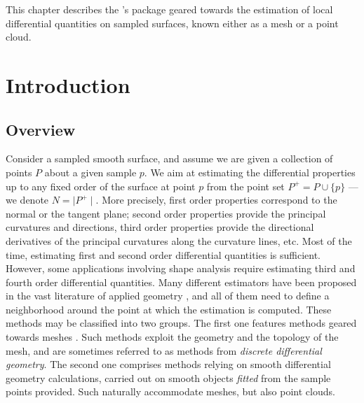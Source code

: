 


This chapter describes the \cgal's package geared towards the
estimation of local differential quantities on sampled surfaces, known
either as a mesh or a point cloud.
 
\section{Introduction}
\label{sec:intro}

\subsection{Overview}

Consider a sampled smooth surface, and assume we are given a
collection of points $P$ about a given sample $p$. We aim at
estimating the differential properties up to any fixed order of the
surface at point $p$ from the point set $P^+ = P\cup \{ p\}$ ---we
denote $N=\mid P^+\mid$. More precisely, first order properties
correspond to the normal or the tangent plane; second order properties
provide the principal curvatures and directions, third order
properties provide the directional derivatives of the principal
curvatures along the curvature lines, etc.  Most of the time,
estimating first and second order differential quantities is
sufficient.  However, some applications involving shape analysis
require estimating third and fourth order differential quantities.
Many different estimators have been proposed in the vast literature of
applied geometry \cite{cgal:p-smrqt-01}, and all of them need to
define a neighborhood around the point at which the estimation is
computed. These methods may be classified into two groups. The first
one features methods geared towards meshes
\cite{cgal:pp-cdmsc-93,cgal:mdsb-ddgot-02,cgal:csm-rdtnc-03}.
Such methods exploit the geometry and the topology of the mesh, and
are sometimes referred to as methods from {\em discrete differential
geometry}.
The second one comprises methods relying on smooth differential
geometry calculations, carried out on smooth objects {\em fitted} from
the sample points provided. Such naturally accommodate meshes, but also
point clouds.


